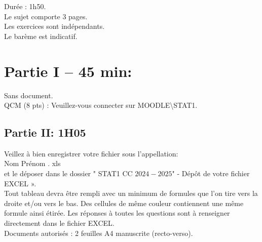 \documentclass[fleqn,a4paper,11pt]{article}
\begin{document}
\begin{center}
Durée : 1h50.\\
Le sujet comporte 3 pages.\\
Les exercices sont indépendants.\\
Le barème est indicatif.\\
\section*{Partie I – 45 min:}

Sans document.\\
QCM (8 pts) : Veuillez-vous connecter sur MOODLE\textbackslash STAT1.\\

\end{center}
\begin{center}
\section*{Partie II: 1H05}
Veillez à bien enregistrer votre fichier sous l'appellation: \\
Nom Prénom . xls
\\
et le déposer dans le dossier " STAT1 CC $2024-2025$" - Dépôt de votre fichier EXCEL ».\\
Tout tableau devra être rempli avec un minimum de formules que l'on tire vers la droite
et/ou vers le bas. Des cellules de même couleur contiennent une même formule ainsi étirée.
Les réponses à toutes les questions sont à renseigner directement dans le fichier EXCEL.\\
Documents autorisés : 2 feuilles A4 manuscrite (recto-verso).
 \end{center}
\def\TD{aebc,peba,azig}  %


\listexo{\TD}
\end{document}
